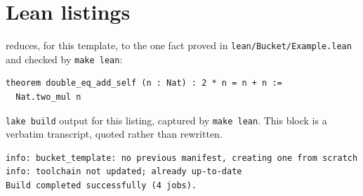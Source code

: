 \documentclass[11pt]{article}
\begin{document}

\section{Lean listings}
\label{app:lean}

 reduces, for this template, to the one fact proved in
\texttt{lean/Bucket/Example.lean} and checked by \texttt{make lean}:

\begin{lstlisting}[style=bucketlean]
theorem double_eq_add_self (n : Nat) : 2 * n = n + n :=
  Nat.two_mul n
\end{lstlisting}

\texttt{lake build} output for this listing, captured by \texttt{make
lean}. This block is a verbatim transcript, quoted rather than rewritten.
\begin{verbatim}
info: bucket_template: no previous manifest, creating one from scratch
info: toolchain not updated; already up-to-date
Build completed successfully (4 jobs).
\end{verbatim}
\end{document}
